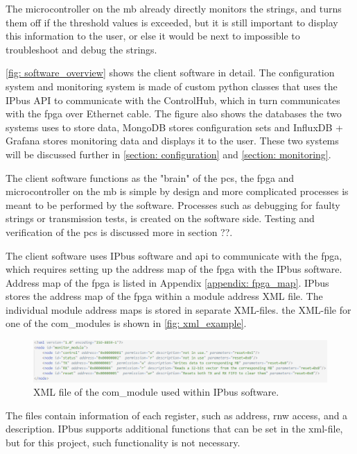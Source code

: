 \documentclass[main.tex]{subfiles}
\begin{document}
The microcontroller on the \gls{mb} already directly monitors the strings, and turns them off if the threshold values is exceeded, but it is still important to display this information to the user, or else it would be next to impossible to troubleshoot and debug the strings.

\autoref{fig: software_overview} shows the client software in detail. The configuration system and monitoring system is made of custom python classes that uses the IPbus API to communicate with the ControlHub, which in turn communicates with the \gls{fpga} over Ethernet cable. The figure also shows the databases the two systems uses to store data, MongoDB stores configuration sets and InfluxDB + Grafana stores monitoring data and displays it to the user. These two systems will be discussed further in \autoref{section: configuration} and \autoref{section: monitoring}.

The client software functions as the "brain" of the \gls{pcs}, the \gls{fpga} and microcontroller on the \gls{mb} is simple by design and more complicated processes is meant to be performed by the software. Processes such as debugging for faulty strings or transmission tests, is created on the software side. Testing and verification of the \gls{pcs} is discussed more in section ??.

The client software uses IPbus software and \gls{api} to communicate with the \gls{fpga}, which requires setting up the address map of the \gls{fpga} with the IPbus software. Address map of the \gls{fpga} is listed in Appendix \ref{appendix: fpga_map}. IPbus stores the address map of the \gls{fpga} within a module address XML file. The individual module address maps is stored in separate XML-files.  the XML-file for one of the com\_modules is shown in \autoref{fig: xml_example}.

\begin{figure}[!htpb]
    \centering
    \includegraphics[scale=0.65]{images/com_module_xml.png}
    \caption{XML file of the com\_module used within IPbus software.}
    \label{fig: xml_example}
\end{figure}
\FloatBarrier

The files contain information of each register, such as address, \gls{rnw} access, and a description. IPbus supports additional functions that can be set in the xml-file, but for this project, such functionality is not necessary.
\end{document}
